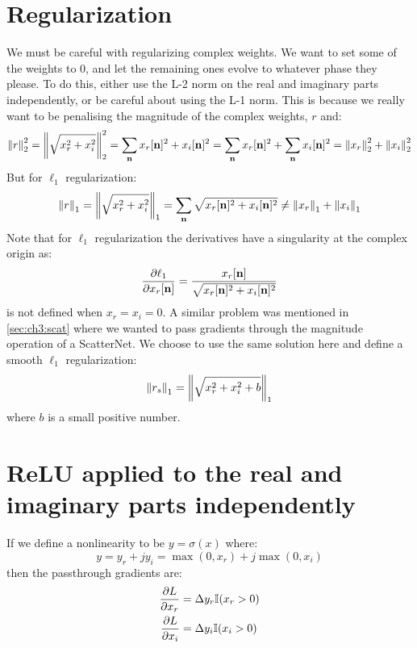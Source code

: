 \section{Regularization}\label{sec:appE:complex_reg}
We must be careful with regularizing complex weights. We want to set some
of the weights to 0, and let the remaining ones evolve to whatever phase they
please. To do this, either use the L-2 norm on the real and imaginary parts
independently, or be careful about using the L-1 norm. This is because we
really want to be penalising the magnitude of the complex weights, $r$ and: 
\begin{equation}
  {\left\lVert r \right\rVert}_{2}^2 = {\left\lVert \sqrt{x_r^2+x_i^2} \right\rVert}_{2}^2 = \sum_{\mathbf{n}} x_r[\mathbf{n}]^2 + x_i[\mathbf{n}]^2 = 
  \sum_{\mathbf{n}} x_r[\mathbf{n}]^2 + \sum_{\mathbf{n}} x_i[\mathbf{n}]^2 = {\left\lVert x_r \right\rVert}_{2}^2 + {\left\lVert x_i \right\rVert}_{2}^2
\end{equation}
But for $\ell_1$ regularization:
\begin{equation}
  {\left\lVert r \right\rVert}_{1} = {\left\lVert \sqrt{x_r^2+x_i^2} \right\rVert}_{1} = \sum_{\mathbf{n}} \sqrt{x_r[\mathbf{n}]^2 + x_i[\mathbf{n}]^2} \neq {\left\lVert x_r \right\rVert}_{1} + {\left\lVert x_i \right\rVert}_{1}
\end{equation}
Note that for $\ell_1$ regularization the derivatives have a singularity at the complex
origin as:
\begin{equation}
  \frac{\partial \ell_1}{\partial x_r[\mathbf{n}]} = \frac{x_r[\mathbf{n}]}{\sqrt{x_r[\mathbf{n}]^2 + x_i[\mathbf{n}]^2}}
\end{equation}
is not defined when $x_r=x_i=0$. A similar problem was mentioned in \autoref{sec:ch3:scat}
where we wanted to pass gradients through the magnitude operation of a
ScatterNet. We choose to use the same solution here and define a smooth $\ell_1$
regularization:
\begin{equation}
  {\left\lVert r_s \right\rVert}_{1} = {\left\lVert \sqrt{x_r^2+x_i^2 + b} \right\rVert}_{1}
\end{equation}
where $b$ is a small positive number.

\section{ReLU applied to the real and imaginary parts independently}\label{sec:appE:complex_relu}
If we define a nonlinearity to be $y = \sigma(x)$ where:
\begin{equation}
  y = y_r + jy_i = \max(0, x_r) + j\max(0, x_i)
\end{equation}
then the passthrough gradients are:
\begin{align}
  \frac{\partial L}{\partial x_r} &= \Delta y_r \mathbb{I}(x_r > 0)\\
  \frac{\partial L}{\partial x_i} &= \Delta y_i \mathbb{I}(x_i > 0)
\end{align}

